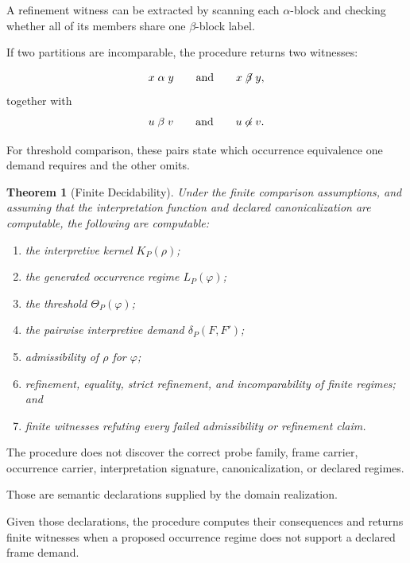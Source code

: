 \documentclass[11pt]{article}
\theoremstyle{plain}
\newtheorem{theorem}{Theorem}[section]
\theoremstyle{definition}
\theoremstyle{remark}
\begin{document}
A refinement witness can be extracted
by scanning each \(\alpha\)-block
and checking whether all of its members
share one \(\beta\)-block label.

If two partitions are incomparable, the procedure returns two witnesses:

\[
  x\mathrel{\alpha}y
  \qquad\text{and}\qquad
  x\not\mathrel{\beta}y,
\]
together with
\[
  u\mathrel{\beta}v
  \qquad\text{and}\qquad
  u\not\mathrel{\alpha}v.
\]

For threshold comparison, these pairs state
which occurrence equivalence one demand requires and the other omits.

\begin{theorem}[Finite Decidability]
  \label{ik.thm.finite-decidability}
  Under the finite comparison assumptions,
  and assuming that the interpretation function
  and declared canonicalization are computable,
  the following are computable:
  \begin{enumerate}[label=(\alph*)]
    \item the interpretive kernel
          \(K_P(\rho)\);
    \item the generated occurrence regime
          \(L_P(\varphi)\);
    \item the threshold
          \(\Theta_P(\varphi)\);
    \item the pairwise interpretive demand
          \(\delta_P(F,F')\);
    \item admissibility of \(\rho\)
          for \(\varphi\);
    \item refinement,
          equality,
          strict refinement,
          and incomparability
          of finite regimes; and
    \item finite witnesses
          refuting every failed admissibility
          or refinement claim.
  \end{enumerate}
\end{theorem}

The procedure does not discover
the correct probe family,
frame carrier,
occurrence carrier,
interpretation signature,
canonicalization,
or declared regimes.

Those are semantic declarations supplied by the domain realization.

Given those declarations,
the procedure computes their consequences and returns finite witnesses
when a proposed occurrence regime does not support a declared frame demand.


\end{document}
